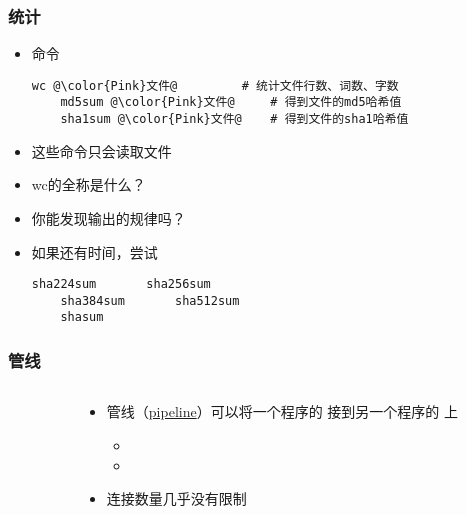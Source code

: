 \begin{CJK}{UTF8}{gbsn}
\begin{frame} [fragile]
	\frametitle{统计}
	\linespread{1.25}
	\begin{itemize}
	\item 命令
	\begin{lstlisting}[style=bashstyle, gobble=4, texcl, escapechar=@]
	wc @\color{Pink}文件@			# 统计文件行数、词数、字数
	md5sum @\color{Pink}文件@		# 得到文件的md5哈希值
	sha1sum @\color{Pink}文件@	# 得到文件的sha1哈希值
	\end{lstlisting}
	\item 这些命令只会读取文件
	\item wc的全称是什么？
	\item 你能发现输出的规律吗？
	\item 如果还有时间，尝试
	\begin{lstlisting}[style=bashstyle, gobble=4, texcl, escapechar=@]
	sha224sum		sha256sum
	sha384sum		sha512sum
	shasum
	\end{lstlisting}
	\end{itemize}
\end{frame}

\begin{frame} [fragile]
	\frametitle{管线}
	\linespread{1.5}
	\begin{columns}[T]
		\begin{column}[T]{.5\textwidth}
			
		\end{column}
		\begin{column}[T]{.5\textwidth}
			\begin{itemize}
			\item 管线（\href{https://en.wikipedia.org/wiki/Pipeline\_(Unix)}
							{pipeline}）可以将一个程序的 
							接到另一个程序的  上
				\begin{itemize}
				\item {}
				\item {}
				\end{itemize}
			\item 连接数量几乎没有限制
			\end{itemize}
		\end{column}
	\end{columns}
\end{frame}


\end{CJK}

